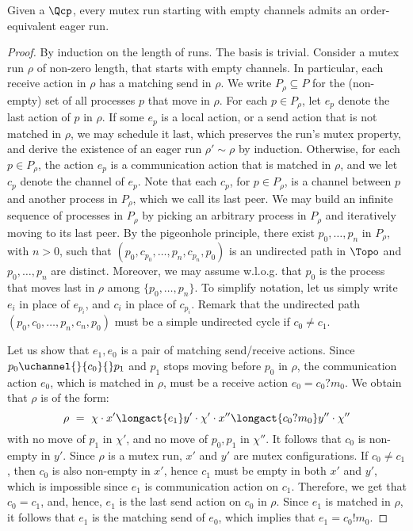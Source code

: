 \documentclass{LMCS}
\newenvironment{proposition}{\begin{prop}}{\end{prop}}
\begin{document}
\begin{proposition}
  \label{p:one-bound}
  Given a \qcp $\Qcp$, every mutex run starting with empty channels
  admits an order-equivalent eager run.
\end{proposition}
\begin{proof}
  By induction on the length of runs.
  The basis is trivial.
  Consider a mutex run $\rho$ of non-zero length, that starts with
  empty channels. In particular, each receive action in
  $\rho$ has a matching send in $\rho$.
  We write $P_\rho \subseteq P$ for the (non-empty) set of all processes
  $p$ that move in $\rho$.
  For each $p \in P_\rho$, let $e_p$ denote the last action of $p$ in
  $\rho$.
  If some $e_p$ is a local action, or a send action that is not matched in
  $\rho$, we may schedule it last, which preserves the run's mutex property,
  and derive the existence of an eager run $\rho' \sim \rho$ by induction.
  Otherwise, for each $p \in P_\rho$, the action $e_p$ is a communication
  action that is matched in $\rho$, and we let $c_p$ denote the channel of
  $e_p$.
  Note that each $c_p$, for $p \in P_\rho$, is a channel between $p$ and
  another process in $P_\rho$, which we call its last peer.
  We may build an infinite sequence of processes in $P_\rho$ by picking an
  arbitrary process in $P_\rho$ and iteratively moving to its last peer.
  By the pigeonhole principle, there exist $p_0, \ldots, p_n$ in $P_\rho$,
  with $n > 0$, such that $(p_0, c_{p_0}, \ldots, p_n, c_{p_n}, p_0)$ is
  an undirected path in $\Topo$ and $p_0, \ldots, p_n$ are distinct.
  Moreover, we may assume w.l.o.g. that $p_0$ is the process that moves
  last in $\rho$ among $\{p_0, \ldots, p_n\}$.
  To simplify notation, let us simply write $e_i$ in place of $e_{p_i}$,
  and $c_i$ in place of $c_{p_i}$.
Remark that the undirected path $(p_0, c_0, \ldots, p_n, c_n, p_0)$ must
  be a simple undirected cycle if $c_0 \neq c_1$.

  Let us show that $e_1, e_0$ is a pair of matching send/receive actions.
  Since $p_0\uchannel{}{c_0}{}p_1$ and $p_1$ stops moving before $p_0$ in
  $\rho$, the communication action $e_0$, which is matched in $\rho$,
  must be a receive action $e_0 = c_0 ? m_0$.
  We obtain that $\rho$ is of the form:
  $$
  \rho \ = \ \chi \cdot x' \longact{e_1} y' \cdot \chi' \cdot
  x'' \longact{c_0 ? m_0} y'' \cdot \chi''
  $$
  with no move of $p_1$ in $\chi'$, and no move of $p_0, p_1$ in $\chi''$.
  It follows that $c_0$ is non-empty in $y'$.
  Since $\rho$ is a mutex run, $x'$ and $y'$ are mutex configurations.
  If $c_0 \neq c_1$, then $c_0$ is also non-empty in $x'$, hence $c_1$
  must be empty in both $x'$ and $y'$, which is impossible since $e_1$
  is communication action on $c_1$.
  Therefore, we get that $c_0 = c_1$, and, hence, $e_1$ is the last send
  action on $c_0$ in $\rho$.
  Since $e_1$ is matched in $\rho$, it follows that $e_1$ is the matching
  send of $e_0$, which implies that $e_1 = c_0 ! m_0$.


\end{proof}
\end{document}
